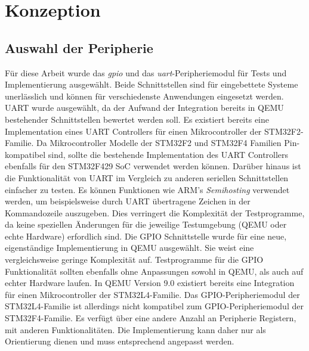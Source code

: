 

\clearpage
\chapter{Konzeption}

\section{Auswahl der Peripherie}

Für diese Arbeit wurde das \textit{\ac{gpio}} und das
\textit{\ac{uart}}-Peripheriemodul für Tests und Implementierung ausgewählt.
Beide Schnittstellen sind für eingebettete Systeme unerlässlich und können für
verschiedenste Anwendungen eingesetzt werden.
\newline
UART wurde ausgewählt, da der Aufwand der Integration bereits in QEMU
bestehender Schnittstellen bewertet werden soll.
Es existiert bereits eine Implementation eines UART Controllers für einen
Mikrocontroller der STM32F2-Familie.
Da Mikrocontroller Modelle der STM32F2 und STM32F4 Familien Pin-kompatibel
sind, sollte die bestehende Implementation des UART Controllers ebenfalls
für den STM32F429 SoC verwendet werden können.
Darüber hinaus ist die Funktionalität von UART im Vergleich zu anderen
seriellen Schnittstellen einfacher zu testen.
Es können Funktionen wie ARM's \textit{Semihosting} verwendet werden, um
beispielsweise durch UART übertragene Zeichen in der Kommandozeile auszugeben.
Dies verringert die Komplexität der Testprogramme, da keine speziellen
Änderungen für die jeweilige Testumgebung (QEMU oder echte Hardware) erfordlich
sind.
\newline
Die GPIO Schnittstelle wurde für eine neue, eigenständige Implementierung in
QEMU ausgewählt.
Sie weist eine vergleichsweise geringe Komplexität auf.
Testprogramme für die GPIO Funktionalität sollten ebenfalls ohne Anpassungen
sowohl in QEMU, als auch auf echter Hardware laufen.
In QEMU Version 9.0 existiert bereits eine Integration für einen
Mikrocontroller der STM32L4-Familie.
Das GPIO-Peripheriemodul der STM32L4-Familie ist allerdings nicht kompatibel
zum GPIO-Peripheriemodul der STM32F4-Familie.
Es verfügt über eine andere Anzahl an Peripherie Registern, mit anderen
Funktionalitäten.
Die Implementierung kann daher nur als Orientierung dienen und muss
entsprechend angepasst werden.

